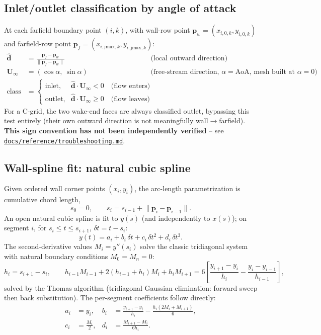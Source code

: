 \documentclass[11pt]{article}
\newcommand{\vecb}[1]{\bm{#1}}
\begin{document}
\subsection{Inlet/outlet classification by angle of attack}
\label{sec:aoa-classify}
At each farfield boundary point \((i,k)\), with wall-row point
\(\vecb{p}_w = (x_{i,0,k}, y_{i,0,k})\) and farfield-row point
\(\vecb{p}_f = (x_{i,\text{jmax},k}, y_{i,\text{jmax},k})\):
\begin{align}
\hat{\vecb{d}} &= \frac{\vecb{p}_f - \vecb{p}_w}{\lVert \vecb{p}_f - \vecb{p}_w \rVert}
&&\text{(local outward direction)} \\
\vecb{U}_\infty &= (\cos\alpha,\ \sin\alpha)
&&\text{(free-stream direction, } \alpha = \text{AoA, mesh built at } \alpha=0\text{)} \\
\text{class} &=
\begin{cases}
\text{inlet}, & \hat{\vecb{d}} \cdot \vecb{U}_\infty < 0 \quad \text{(flow enters)}\\
\text{outlet}, & \hat{\vecb{d}} \cdot \vecb{U}_\infty \ge 0 \quad \text{(flow leaves)}
\end{cases}
\end{align}
For a C-grid, the two wake-end faces are always classified outlet,
bypassing this test entirely (their own outward direction is not
meaningfully wall\(\to\)farfield). \textbf{This sign convention has not
been independently verified} -- see
\href{https://github.com/kvishalrai/AeroHexMesh/blob/master/docs/reference/troubleshooting.md}{\texttt{docs/reference/troubleshooting.md}}.

\subsection{Wall-spline fit: natural cubic spline}
\label{sec:wall-spline}
Given ordered wall corner points \((x_i, y_i)\), the arc-length
parametrization is cumulative chord length,
\begin{equation}
s_0 = 0, \qquad s_i = s_{i-1} + \lVert \vecb{p}_i - \vecb{p}_{i-1} \rVert .
\end{equation}
An open natural cubic spline is fit to \(y(s)\) (and independently to
\(x(s)\)); on segment \(i\), for \(s_i \le t \le s_{i+1}\), \(\delta t = t - s_i\):
\begin{equation}
y(t) = a_i + b_i\,\delta t + c_i\,\delta t^2 + d_i\,\delta t^3 .
\end{equation}
The second-derivative values \(M_i = y''(s_i)\) solve the classic
tridiagonal system with natural boundary conditions \(M_0 = M_n = 0\):
\begin{equation}
h_i = s_{i+1}-s_i, \qquad
h_{i-1} M_{i-1} + 2(h_{i-1}+h_i) M_i + h_i M_{i+1}
= 6\!\left[\frac{y_{i+1}-y_i}{h_i} - \frac{y_i - y_{i-1}}{h_{i-1}}\right],
\end{equation}
solved by the Thomas algorithm (tridiagonal Gaussian elimination:
forward sweep then back substitution). The per-segment coefficients
follow directly:
\begin{align}
a_i &= y_i, &
b_i &= \frac{y_{i+1}-y_i}{h_i} - \frac{h_i(2M_i + M_{i+1})}{6}, \\
c_i &= \frac{M_i}{2}, &
d_i &= \frac{M_{i+1}-M_i}{6h_i}.
\end{align}
\end{document}
